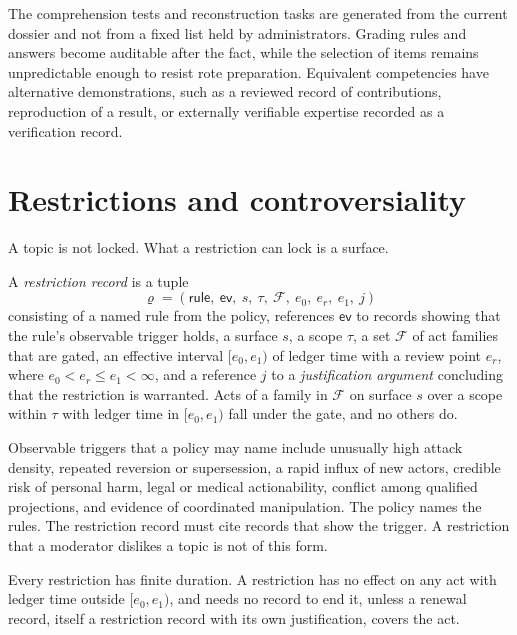 \begin{designrule}\label{rule:testbank}
The comprehension tests and reconstruction tasks are generated from the current dossier and not from a fixed list held by administrators. Grading rules and answers become auditable after the fact, while the selection of items remains unpredictable enough to resist rote preparation. Equivalent competencies have alternative demonstrations, such as a reviewed record of contributions, reproduction of a result, or externally verifiable expertise recorded as a verification record.
\end{designrule}

\section{Restrictions and controversiality}\label{sec:restrictions}

A topic is not locked. What a restriction can lock is a surface.

\begin{definition}[Restriction]\label{def:restriction}
A \emph{restriction record} is a tuple
\[
\varrho=(\mathsf{rule},\ \mathsf{ev},\ s,\ \tau,\ \mathcal F,\ e_0,\ e_r,\ e_1,\ j)
\]
consisting of a named rule from the policy, references $\mathsf{ev}$ to records showing that the rule's observable trigger holds, a surface $s$, a scope $\tau$, a set $\mathcal F$ of act families that are gated, an effective interval $[e_0,e_1)$ of ledger time with a review point $e_r$, where $e_0<e_r\le e_1<\infty$, and a reference $j$ to a \emph{justification argument} concluding that the restriction is warranted. Acts of a family in $\mathcal F$ on surface $s$ over a scope within $\tau$ with ledger time in $[e_0,e_1)$ fall under the gate, and no others do.
\end{definition}

Observable triggers that a policy may name include unusually high attack density, repeated reversion or supersession, a rapid influx of new actors, credible risk of personal harm, legal or medical actionability, conflict among qualified projections, and evidence of coordinated manipulation. The policy names the rules. The restriction record must cite records that show the trigger. A restriction that a moderator dislikes a topic is not of this form.

\begin{proposition}\label{prop:expire}
Every restriction has finite duration. A restriction has no effect on any act with ledger time outside $[e_0,e_1)$, and needs no record to end it, unless a renewal record, itself a restriction record with its own justification, covers the act.
\end{proposition}

